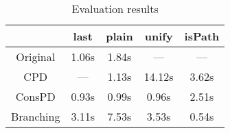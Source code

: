\begin{table}
  \centering
  \begin{tabular}{c||c|c||c||c}
                   & last  & plain & unify  & isPath \\ \hline\hline
  Original         & 1.06s & 1.84s & ---    & ---    \\ \hline
  CPD              & ---   & 1.13s & 14.12s & 3.62s  \\ \hline
  ConsPD           & 0.93s & 0.99s & 0.96s  & 2.51s  \\ \hline
  Branching        & 3.11s & 7.53s & 3.53s  & 0.54s  \\ \hline
  \end{tabular}

  \caption{Evaluation results}
  \label{tbl:eval}
\end{table}





